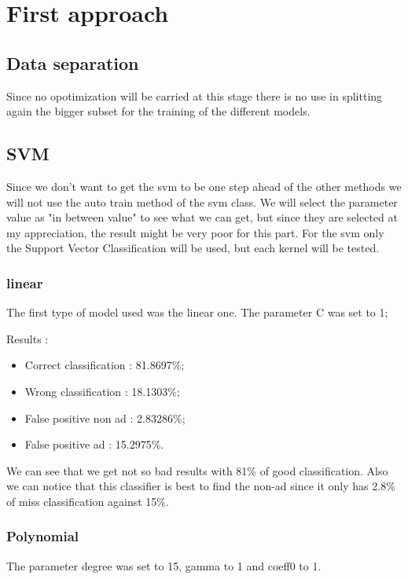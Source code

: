 \chapter{First approach}

\section{Data separation}

Since no opotimization will be carried at this stage there is no use in splitting again the bigger subset for the training of the different models.

\section{SVM}

Since we don't want to get the svm to be one step ahead of the other methods we will not use the auto train method of the svm class. We will select the parameter value as "in between value" to see what we can get, but since they are selected at my appreciation, the result might be very poor for this part.
For the svm only the Support Vector Classification will be used, but each kernel will be tested.


\subsection{linear}

The first type of model used was the linear one. The parameter C was set to 1;

Results :
\begin{itemize}
  \item Correct classification : 81.8697\%;
  \item Wrong classification : 18.1303\%;
  \item False positive non ad : 2.83286\%;
  \item False positive ad : 15.2975\%.
\end{itemize}

We can see that we get not so bad results with 81\% of good classification. Also we can notice that this classifier is best to find the non-ad since it only has 2.8\% of miss classification against 15\%.

\subsection{Polynomial}
The parameter degree was set to 15, gamma to 1 and coeff0 to 1.

